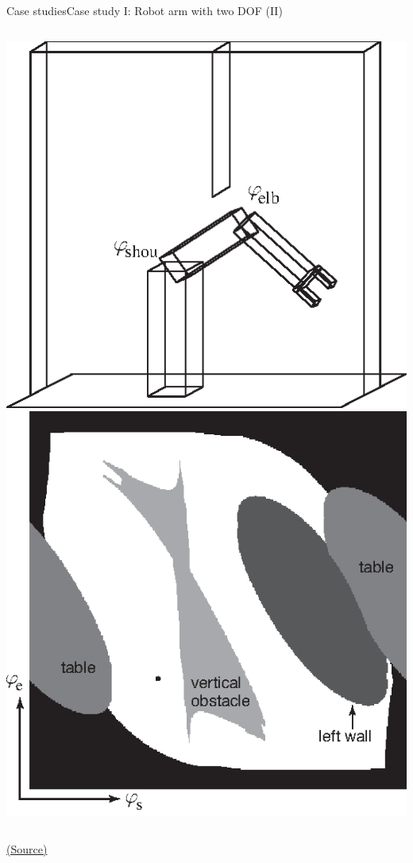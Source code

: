 \documentclass[10pt,compress]{beamer} %
\begin{document}
\begin{frame}{Case studies}{Case study I: Robot arm with two DOF (II)}
       \begin{columns}
            \centering \includegraphics[width=\linewidth]{figs/armPlain.eps}\\
            \centering \includegraphics[width=\linewidth]{figs/armPlainConfSpace.eps}\\
     \end{columns}
  \centering \tiny{\href{http://aima.cs.berkeley.edu/index.html}{(Source)}}
\end{frame}
\end{document}
